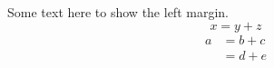 \documentclass[12pt,a4paper,fleqn]{report}
\begin{document}
Some text here to show the left margin.
\[
x = y + z
\]
\begin{align*}
a &= b + c \\
  &= d + e
\end{align*}
\end{document}
